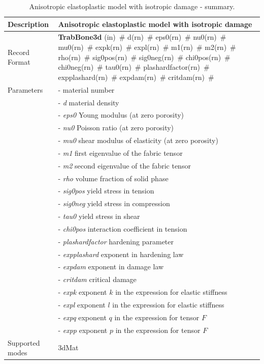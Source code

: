 \documentclass[a4paper]{article}
\newcommand{\mbf}[1]{\mbox{\boldmath$#1$}}
\newcommand{\descitem}[1]{{\noindent \bf #1}}
\newcommand{\elemparam}[2]{{{#1\tiny (#2)}~\#}}
\newcommand{\param}[1]{{\it #1}}
\newenvironment{mmt}{\begin{tabular}{|l|p{9cm}|}}{\end{tabular}\\}
\newenvironment{mmt}{\begin{tabular}{|l|l|}}{\end{tabular}\\}
\begin{document}
\begin{table}[!htb]
\begin{mmt}
\hline
Description & Anisotropic elastoplastic model with isotropic damage\\
\hline
Record Format & \descitem{TrabBone3d}  \elemparam{}{in}
\elemparam{d}{rn} \elemparam{eps0}{rn} \elemparam{nu0}{rn} \elemparam{mu0}{rn} \elemparam{expk}{rn} \elemparam{expl}{rn} \elemparam{m1}{rn} \elemparam{m2}{rn} \elemparam{rho}{rn}
\elemparam{sig0pos}{rn} \elemparam{sig0neg}{rn} \elemparam{chi0pos}{rn} \elemparam{chi0neg}{rn} \elemparam{tau0}{rn} \elemparam{plashardfactor}{rn} \elemparam{expplashard}{rn} \elemparam{expdam}{rn} \elemparam{critdam}{rn}\\
Parameters &- \param{} material number\\
&- \param{d} material density\\
&- \param{eps0} Young modulus (at zero porosity)\\
&- \param{nu0} Poisson ratio (at zero porosity)\\
&- \param{mu0} shear modulus of elasticity (at zero porosity)\\
&- \param{m1} first eigenvalue of the fabric tensor\\
&- \param{m2} second eigenvalue of the fabric tensor\\
&- \param{rho} volume fraction of solid phase\\
&- \param{sig0pos} yield stress in tension\\
&- \param{sig0neg} yield stress in compression\\
&- \param{tau0} yield stress in shear\\
&- \param{chi0pos} interaction coefficient in tension\\
&- \param{plashardfactor} hardening parameter\\
&- \param{expplashard} exponent in hardening law\\
&- \param{expdam} exponent in damage law\\
&- \param{critdam} critical damage\\
&- \param{expk} exponent $k$ in the expression for elastic stiffness\\
&- \param{expl} exponent $l$ in the expression for elastic stiffness\\
&- \param{expq} exponent $q$ in the expression for tensor \mbf{F}\\
&- \param{expp} exponent $p$ in the expression for tensor \mbf{F}\\
Supported modes& 3dMat\\
\hline
\end{mmt}
\caption{Anisotropic elastoplastic model with isotropic damage - summary.}
\label{trabbone_table}
\end{table}
\end{document}
